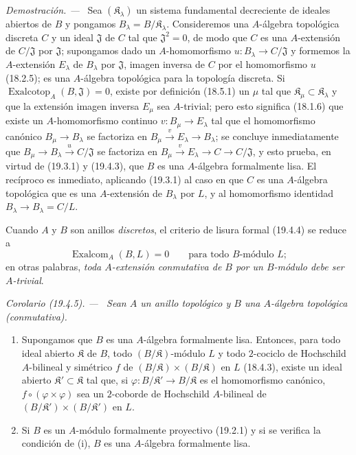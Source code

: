 \documentclass[10pt,oneside]{book}
\makeatletter
\newcommand{\setmanualcurrentlabel}[1]{\def\@currentlabel{#1}}
\newenvironment{corollary}[1][]{%
  \setmanualcurrentlabel{#1}\par\medskip\noindent\itshape Corolario (#1). ---\ }{\par}
\newenvironment{proof}{%
  \par\medskip\noindent\textit{Demostración. ---\ }}{\par}
\makeatother
\begin{document}
\begin{proof}
Sea $(\mathfrak K_\lambda)$ un sistema fundamental decreciente de ideales
abiertos de $B$ y pongamos $B_\lambda=B/\mathfrak K_\lambda$.
Consideremos una $A$-álgebra topológica discreta $C$ y un ideal
$\mathfrak J$ de $C$ tal que $\mathfrak J^2=0$, de modo que $C$ es una
$A$-extensión de $C/\mathfrak J$ por $\mathfrak J$; supongamos dado un
$A$-homomorfismo $u:B_\lambda\to C/\mathfrak J$ y formemos la
$A$-extensión $E_\lambda$ de $B_\lambda$ por $\mathfrak J$, imagen
inversa de $C$ por el homomorfismo $u$ (18.2.5); es una $A$-álgebra
topológica para la topología discreta. Si
$\operatorname{Exalcotop}_A(B,\mathfrak J)=0$, existe por definición (18.5.1) un
$\mu$ tal que $\mathfrak K_\mu\subset\mathfrak K_\lambda$ y que
la extensión imagen inversa $E_\mu$ sea $A$-trivial; pero esto significa
(18.1.6) que existe un $A$-homomorfismo continuo
$v:B_\mu\to E_\lambda$ tal que el homomorfismo canónico
$B_\mu\to B_\lambda$ se factoriza en
$B_\mu\xrightarrow{v}E_\lambda\to B_\lambda$; se concluye
inmediatamente que $B_\mu\to B_\lambda\xrightarrow{u}C/\mathfrak J$ se
factoriza en
$B_\mu\xrightarrow{v}E_\lambda\to C\to C/\mathfrak J$, y esto
prueba, en virtud de (19.3.1) y (19.4.3), que $B$ es una $A$-álgebra
formalmente lisa. El recíproco es inmediato, aplicando (19.3.1) al caso
en que $C$ es una $A$-álgebra topológica que es una $A$-extensión de
$B_\lambda$ por $L$, y al homomorfismo identidad
$B_\lambda\to B_\lambda=C/L$.
\end{proof}

Cuando $A$ y $B$ son anillos \emph{discretos}, el criterio de lisura formal
(19.4.4) se reduce a
\begin{equation}
\tag{19.4.4.1}
\label{0.19.4.4.1-es}
\operatorname{Exalcom}_A(B,L)=0\qquad\text{para todo $B$-módulo $L$};
\end{equation}
en otras palabras, \emph{toda $A$-extensión conmutativa de $B$ por un
$B$-módulo debe ser $A$-trivial}.

\begin{corollary}[19.4.5]
\label{0.19.4.5-es}
Sean $A$ un anillo topológico y $B$ una $A$-álgebra topológica
(conmutativa).
\begin{enumerate}
  \item[\textup{(i)}] Supongamos que $B$ es una $A$-álgebra formalmente lisa.
  Entonces, para todo ideal abierto $\mathfrak K$ de $B$, todo
  $(B/\mathfrak K)$-módulo $L$ y todo $2$-cociclo de Hochschild
  $A$-bilineal y simétrico $f$ de
  $(B/\mathfrak K)\times(B/\mathfrak K)$ en $L$ \textup{(18.4.3)}, existe un
  ideal abierto $\mathfrak K'\subset\mathfrak K$ tal que, si
  $\varphi:B/\mathfrak K'\to B/\mathfrak K$ es el homomorfismo
  canónico, $f\circ(\varphi\times\varphi)$ sea un $2$-coborde de
  Hochschild $A$-bilineal de
  $(B/\mathfrak K')\times(B/\mathfrak K')$ en $L$.
  \item[\textup{(ii)}] Si $B$ es un $A$-módulo formalmente proyectivo \textup{(19.2.1)} y si
  se verifica la condición de \textup{(i)}, $B$ es una $A$-álgebra formalmente
  lisa.
\end{enumerate}
\end{corollary}
\end{document}
